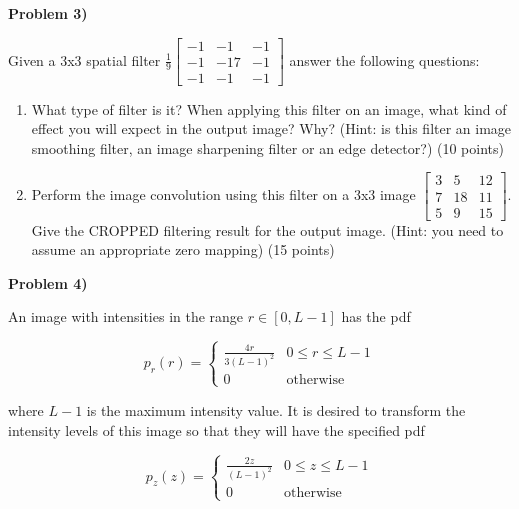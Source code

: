 \documentclass[12pt]{article}
\newcommand{\problem}[1]{%
  \vspace{0.5cm}
  {\noindent\normalsize \textbf{#1}}
  \vspace{0.3cm}
}
\begin{document}
\newpage


\problem{Problem 3)}

Given a 3x3 spatial filter $\displaystyle\frac{1}{9}\begin{bmatrix} -1 & -1 & -1 \\ -1 & -17 & -1 \\ -1 & -1 & -1 \end{bmatrix}$ answer the following questions:

\begin{enumerate}
\item What type of filter is it? When applying this filter on an image, what kind of effect you
will expect in the output image? Why? (Hint: is this filter an image smoothing filter, an
image sharpening filter or an edge detector?) (10 points)

\item Perform the image convolution using this filter on a 3x3 image $\begin{bmatrix} 3 & 5 & 12 \\ 7 & 18 & 11 \\ 5 & 9 & 15 \end{bmatrix}$. Give the
CROPPED filtering result for the output image. (Hint: you need to assume an appropriate
zero mapping) (15 points)
\end{enumerate}

\newpage


\problem{Problem 4)}

An image with intensities in the range $r \in [0, L-1]$ has the pdf

\[
p_r(r) = \begin{cases} \displaystyle\frac{4r}{3(L-1)^2} & 0 \le r \le L-1 \\[0.5em] 0 & \text{otherwise} \end{cases}
\]

where $L-1$ is the maximum intensity value. It is desired to transform the intensity levels of this image so that they will have the specified pdf

\[
p_z(z) = \begin{cases} \displaystyle\frac{2z}{(L-1)^2} & 0 \le z \le L-1 \\[0.5em] 0 & \text{otherwise} \end{cases}
\]
\end{document}
